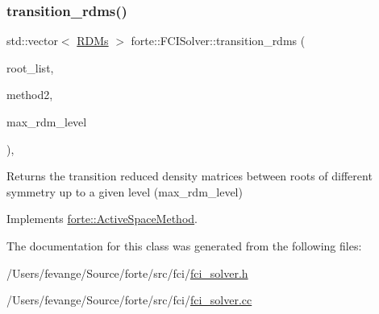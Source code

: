 \subsubsection{\texorpdfstring{transition\+\_\+rdms()}{transition\_rdms()}}
{\footnotesize\ttfamily std\+::vector$<$ \mbox{\hyperlink{classforte_1_1_r_d_ms}{R\+D\+Ms}} $>$ forte\+::\+F\+C\+I\+Solver\+::transition\+\_\+rdms (\begin{DoxyParamCaption}\item[{const std\+::vector$<$ std\+::pair$<$ size\+\_\+t, size\+\_\+t $>$$>$ \&}]{root\+\_\+list,  }\item[{std\+::shared\+\_\+ptr$<$ \mbox{\hyperlink{classforte_1_1_active_space_method}{Active\+Space\+Method}} $>$}]{method2,  }\item[{int}]{max\+\_\+rdm\+\_\+level }\end{DoxyParamCaption})\hspace{0.3cm}{\ttfamily [override]}, {\ttfamily [virtual]}}

Returns the transition reduced density matrices between roots of different symmetry up to a given level (max\+\_\+rdm\+\_\+level) 

Implements \mbox{\hyperlink{classforte_1_1_active_space_method_a4460069915e56a1994d3a4a4e78bdb30}{forte\+::\+Active\+Space\+Method}}.



The documentation for this class was generated from the following files\+:\begin{DoxyCompactItemize}
\item 
/\+Users/fevange/\+Source/forte/src/fci/\mbox{\hyperlink{fci__solver_8h}{fci\+\_\+solver.\+h}}\item 
/\+Users/fevange/\+Source/forte/src/fci/\mbox{\hyperlink{fci__solver_8cc}{fci\+\_\+solver.\+cc}}\end{DoxyCompactItemize}
